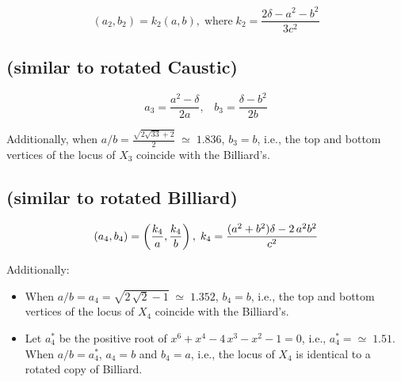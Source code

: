 \begin{equation*}
 \left(a_2,b_2\right)=k_2\left(a,b\right),\;\textrm{where}\; k_2=\frac{2\delta -{a}^{2}-{b}^{2}}{3c^2}
\end{equation*}

 \subsection{ (similar to rotated Caustic)}
 
\begin{equation*}
 a_3=\frac{{a}^{2}-\delta}{2a},\;\;\;
 b_3=\frac{\delta-{b}^{2}}{2b}
\end{equation*}

Additionally, when $a/b= \frac{\sqrt{2\sqrt{33}+2}}{2} \;{\simeq}\;1.836$, $b_3=b$, i.e., the top and bottom vertices of the locus of $X_3$ coincide with the Billiard's.

\subsection{ (similar to rotated Billiard)}
\label{app:x4}
 
\begin{equation*}
\scriptsize
\left(a_4,b_4\right)=\left(\frac{k_4}{a},\frac{k_4}{b}\right),\;  k_4=\frac{  ({a}^{2}+{b}^{2})\delta-2\,{a}^{2}{b}^{2} }{c^2}
\end{equation*}

Additionally:
\begin{itemize}
\item When
$a/b=a_4=\sqrt{2\,\sqrt {2}-1}\;{\simeq}\;1.352$, $b_4=b$, i.e., the top and bottom vertices of the locus of $X_4$ coincide with the Billiard's.


\item Let $a_4^*$ be the positive root of
${x}^{6}+{x}^{4}-4\,{x}^{3}-{x}^{2}-1=0$, i.e.,
$a_4^{*}={\simeq}\;1.51$. When $a/b=a_4^{*}$, $a_4=b$ and $b_4=a$, i.e., the locus of $X_4$ is identical to a rotated copy of Billiard. %
\end{itemize}

\subsection{}

